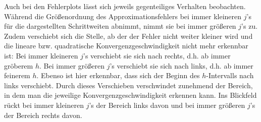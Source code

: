 \documentclass{scrartcl}
\begin{document}
Auch bei den Fehlerplots lässt sich jeweils gegenteiliges Verhalten beobachten. Während die Größenordnung des Approximationsfehlers bei immer kleineren $j$'s für die dargestellten Schrittweiten abnimmt, nimmt sie bei immer größeren $j$'s zu. Zudem verschiebt sich die Stelle, ab der der Fehler nicht weiter kleiner wird und die lineare bzw. quadratische Konvergenzgeschwindigkeit nicht mehr erkennbar ist: Bei immer kleineren $j$'s verschiebt sie sich nach rechts, d.h. ab immer gröberem $h$. Bei immer größeren $j$'s verschiebt sie sich nach links, d.h. ab immer feinerem $h$. Ebenso ist hier erkennbar, dass sich der Beginn des $h$-Intervalls nach links verschiebt. Durch dieses Verschieben verschwindet zunehmend der Bereich, in dem man die jeweilige Konvergenzgeschwindigkeit erkennen kann. Ins Blickfeld rückt bei immer kleineren $j$'s der Bereich links davon und bei immer größeren $j$'s der Bereich rechts davon.
\end{document}
